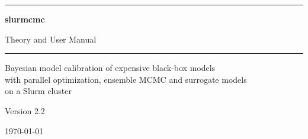 \documentclass[11pt,a4paper,openany]{report}
\begin{document}
\begin{titlepage}
  \centering
  \vspace*{5cm}
  {\color{accent}\rule{0.95\textwidth}{1pt}}\par\vspace{0.6cm}
  {\fontsize{34}{40}\selectfont\bfseries\color{accent} slurmcmc\par}
  \vspace{0.35cm}
  {\LARGE Theory and User Manual\par}
  \vspace{0.6cm}
  {\color{accent}\rule{0.95\textwidth}{1pt}}\par
  \vspace{1.2cm}
  {\large Bayesian model calibration of expensive black-box models\\
   with parallel optimization, ensemble MCMC and surrogate models\\
   on a Slurm cluster\par}
  \vfill
  {\large Version 2.2\par}
  \vspace{0.3cm}
  {\large \today\par}
\end{titlepage}

\tableofcontents
\clearpage
{}








\appendix


\end{document}
